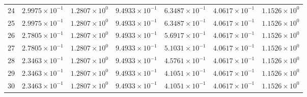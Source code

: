 \begin{table}[H]
\begin{tabular}{@{}rrrrrrr@{}}
24 & $2.9975\times10^{-1}$ & $1.2807\times10^{0}$ & $9.4933\times10^{-1}$ & $6.3487\times10^{-1}$ & $4.0617\times10^{-1}$ & $1.1526\times10^{0}$\\
25 & $2.9975\times10^{-1}$ & $1.2807\times10^{0}$ & $9.4933\times10^{-1}$ & $6.3487\times10^{-1}$ & $4.0617\times10^{-1}$ & $1.1526\times10^{0}$\\
26 & $2.7805\times10^{-1}$ & $1.2807\times10^{0}$ & $9.4933\times10^{-1}$ & $5.6917\times10^{-1}$ & $4.0617\times10^{-1}$ & $1.1526\times10^{0}$\\
27 & $2.7805\times10^{-1}$ & $1.2807\times10^{0}$ & $9.4933\times10^{-1}$ & $5.1031\times10^{-1}$ & $4.0617\times10^{-1}$ & $1.1526\times10^{0}$\\
28 & $2.3463\times10^{-1}$ & $1.2807\times10^{0}$ & $9.4933\times10^{-1}$ & $4.5761\times10^{-1}$ & $4.0617\times10^{-1}$ & $1.1526\times10^{0}$\\
29 & $2.3463\times10^{-1}$ & $1.2807\times10^{0}$ & $9.4933\times10^{-1}$ & $4.1051\times10^{-1}$ & $4.0617\times10^{-1}$ & $1.1526\times10^{0}$\\
30 & $2.3463\times10^{-1}$ & $1.2807\times10^{0}$ & $9.4933\times10^{-1}$ & $4.1051\times10^{-1}$ & $4.0617\times10^{-1}$ & $1.1526\times10^{0}$\\
\bottomrule
\end{tabular}
\end{table}

